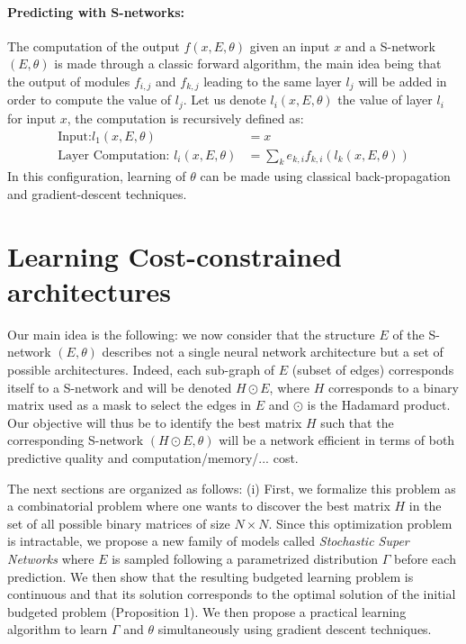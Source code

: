\documentclass[10pt,twocolumn,letterpaper]{article}
\begin{document}
\paragraph{Predicting with S-networks:} The computation of the output $f(x,E,\theta)$ given an input $x$ and a S-network $(E,\theta)$ is made through a classic forward algorithm, the main idea being that the output of modules $f_{i,j}$ and $f_{k,j}$ leading to the same layer $l_j$ will be added in order to compute the value of $l_j$. Let us denote $l_i(x,E,\theta)$ the value of layer $l_i$ for input $x$, the computation is recursively defined as: 
\begin{equation}
\begin{aligned}
\text{Input:} l_1(x,E,\theta) &= x \\
\text{Layer Computation: } l_i(x,E,\theta) &= \sum\limits_k e_{k,i} f_{k,i}(l_k(x,E,\theta))
\end{aligned}
\end{equation}
 In this configuration, learning of $\theta$ can be made using classical back-propagation and gradient-descent techniques.

\section{Learning Cost-constrained architectures}
\label{section_super_net}

Our main idea is the following: we now consider that the structure $E$ of the S-network $(E,\theta)$ describes not a single neural network architecture but a set of possible architectures. Indeed, each sub-graph of $E$ (subset of edges)  corresponds itself to a S-network and will be denoted $H \odot E$, where $H$ corresponds to a binary matrix used as a mask to select the edges in $E$ and $\odot$ is the Hadamard product. Our objective will thus be to identify the best matrix $H$  such that the corresponding S-network $(H \odot E,\theta)$ will be a network efficient in terms of both predictive quality and computation/memory/... cost. 

The next sections are organized as follows: (i) First, we formalize this problem as a combinatorial problem where one wants to discover the best matrix $H$ in the set of all possible binary matrices of size $N \times N$. Since this optimization problem is intractable, we propose a new family of models called \textit{Stochastic Super Networks} where $E$ is sampled following a parametrized distribution $\Gamma$ before each prediction. We then show that the resulting budgeted learning problem is continuous and that its solution corresponds to the optimal solution of the initial budgeted problem (Proposition 1). We then propose a practical learning algorithm to learn $\Gamma$ and $\theta$ simultaneously using gradient descent techniques.
\end{document}
